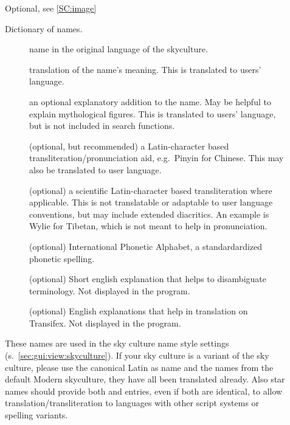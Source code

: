 \begin{description}
\item[] Optional, see \ref{SC:image}
\item[] Dictionary of names. %

	\begin{description}
	    \item[] name in the original language of the skyculture. 
	    \item[] translation of the name's meaning. This is translated to users' language.
	    \item[] an optional explanatory addition to the name.   May be helpful to explain mythological figures. 
		This is translated to users' language, but is not included in search functions.
	    \item[] (optional, but recommended) a Latin-character based transliteration/pronunciation aid, e.g.\ Pinyin for Chinese. 
		This may also be translated to user language.
	    \item[] (optional) a scientific Latin-character based transliteration where applicable. 
		This is not translatable or adaptable to user language conventions, but may include extended diacritics. 
		An example is Wylie for Tibetan, which is not meant to help in pronunciation.  
	    \item[] (optional) International Phonetic Alphabet, a standardardized phonetic spelling.
	    \item[] (optional) Short english explanation that helps to disambiguate terminology. Not displayed in the program.
	    \item[] (optional) English explanations that help in translation on Transifex. Not displayed in the program.
	\end{description}

	These names are used in the sky culture name style settings (s.~\ref{sec:gui:view:skyculture}). 
	If your sky culture is a variant of the  sky culture, 
	please use the canonical Latin as  name and the  names from the default Modern skyculture, they have all been translated already.
	Also star names should provide both  and  entries, even if both are identical, 
	to allow translation/transliteration to languages with other script systems or spelling variants.


\end{description}
